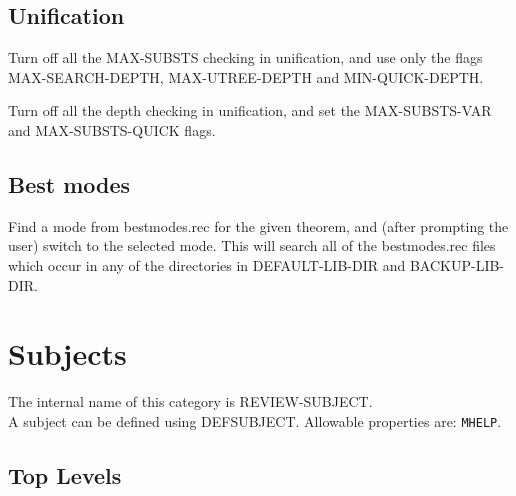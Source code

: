 \section{Unification}

\begin{description} 
\item[UNIF-DEPTHS]  
Turn off all the MAX-SUBSTS checking in unification,
and use only the flags MAX-SEARCH-DEPTH, MAX-UTREE-DEPTH
and MIN-QUICK-DEPTH.

\item[UNIF-NODEPTHS]  
Turn off all the depth checking in unification,
and set the MAX-SUBSTS-VAR and MAX-SUBSTS-QUICK flags.
\item
\end{description}

\section{Best modes}

\begin{description} 
\item[FIND-MODE]  
Find a mode from bestmodes.rec for the given theorem,
and (after prompting the user) switch to the selected mode.
This will search all of the bestmodes.rec files which occur
in any of the directories in DEFAULT-LIB-DIR and BACKUP-LIB-DIR.
\item
\end{description}
\chapter{Subjects}
The internal name of this category is 
REVIEW-SUBJECT.\\
A subject can be defined using DEFSUBJECT.
Allowable properties are: \texttt{MHELP}.

\section{Top Levels}

